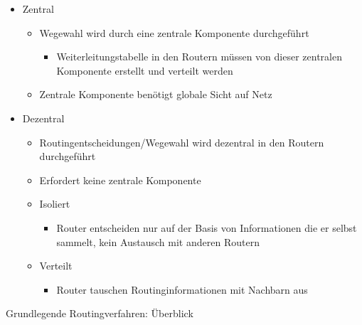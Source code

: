       \begin{itemize}
        \item Zentral
          \begin{itemize}
            \item Wegewahl wird durch eine zentrale Komponente durchgeführt
              \begin{itemize}
                \item Weiterleitungstabelle in den Routern müssen von dieser zentralen Komponente
                  erstellt und verteilt werden
              \end{itemize}
            \item Zentrale Komponente benötigt globale Sicht auf Netz
          \end{itemize}
        \item Dezentral
          \begin{itemize}
            \item Routingentscheidungen/Wegewahl wird dezentral in den Routern durchgeführt
            \item Erfordert keine zentrale Komponente
            \item Isoliert
              \begin{itemize}
                \item Router entscheiden nur auf der Basis von Informationen die er selbst sammelt,
                  kein Austausch mit anderen Routern
              \end{itemize}
            \item Verteilt
              \begin{itemize}
                \item Router tauschen Routinginformationen mit Nachbarn aus
              \end{itemize}
          \end{itemize}
      \end{itemize}
      Grundlegende Routingverfahren: Überblick
